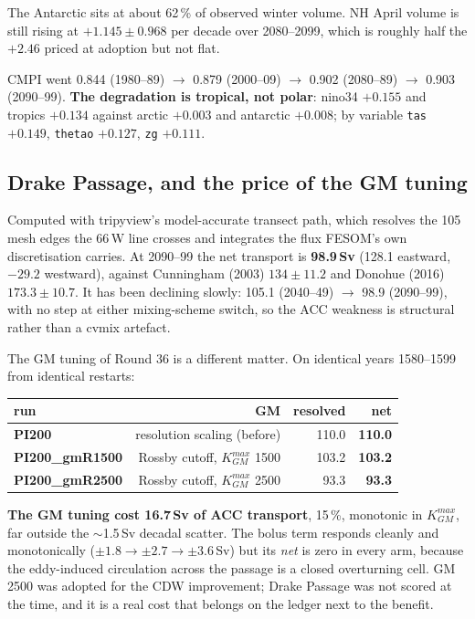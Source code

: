\documentclass[10pt]{article}
\begin{document}
The Antarctic sits at about 62\,\% of observed winter volume. NH April volume is still rising at
$+1.145\pm0.968$ per decade over 2080--2099, which is roughly half the $+2.46$ priced at
adoption but not flat.

CMPI went 0.844 (1980--89) $\to$ 0.879 (2000--09) $\to$ 0.902 (2080--89) $\to$ 0.903
(2090--99). \textbf{The degradation is tropical, not polar}: nino34 $+0.155$ and tropics
$+0.134$ against arctic $+0.003$ and antarctic $+0.008$; by variable \texttt{tas} $+0.149$,
\texttt{thetao} $+0.127$, \texttt{zg} $+0.111$.

\subsection{Drake Passage, and the price of the GM tuning}\label{sub:r40drake}

Computed with tripyview's model-accurate transect path, which resolves the 105 mesh edges the
66\,W line crosses and integrates the flux FESOM's own discretisation carries. At 2090--99 the
net transport is \textbf{98.9\,Sv} (128.1 eastward, $-29.2$ westward), against Cunningham
(2003) $134\pm11.2$ and Donohue (2016) $173.3\pm10.7$. It has been declining slowly:
105.1 (2040--49) $\to$ 98.9 (2090--99), with no step at either mixing-scheme switch, so the ACC
weakness is structural rather than a cvmix artefact.

The GM tuning of Round 36 is a different matter. On identical years 1580--1599 from identical
restarts:

\begin{center}
\begin{tabular}{lrrr}
\hline
run & GM & resolved & \textbf{net} \\
\hline
\textbf{PI200}          & resolution scaling (before) & 110.0 & \textbf{110.0} \\
\textbf{PI200\_gmR1500} & Rossby cutoff, $K_{GM}^{max}$ 1500 & 103.2 & \textbf{103.2} \\
\textbf{PI200\_gmR2500} & Rossby cutoff, $K_{GM}^{max}$ 2500 & 93.3 & \textbf{93.3} \\
\hline
\end{tabular}
\end{center}

\textbf{The GM tuning cost 16.7\,Sv of ACC transport}, 15\,\%, monotonic in $K_{GM}^{max}$, far
outside the $\sim$1.5\,Sv decadal scatter. The bolus term responds cleanly and monotonically
($\pm1.8\to\pm2.7\to\pm3.6$\,Sv) but its \emph{net} is zero in every arm, because the
eddy-induced circulation across the passage is a closed overturning cell. GM 2500 was adopted
for the CDW improvement; Drake Passage was not scored at the time, and it is a real cost that
belongs on the ledger next to the benefit.
\end{document}

